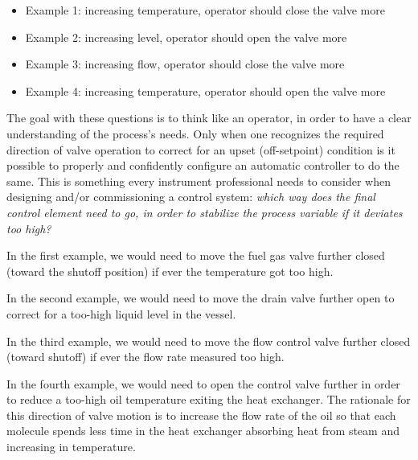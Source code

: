 





\begin{itemize}
\item{} Example 1: increasing temperature, operator should close the valve more
\item{} Example 2: increasing level, operator should open the valve more
\item{} Example 3: increasing flow, operator should close the valve more
\item{} Example 4: increasing temperature, operator should open the valve more
\end{itemize}

The goal with these questions is to think like an operator, in order to have a clear understanding of the process's needs.  Only when one recognizes the required direction of valve operation to correct for an upset (off-setpoint) condition is it possible to properly and confidently configure an automatic controller to do the same.  This is something every instrument professional needs to consider when designing and/or commissioning a control system: {\it which way does the final control element need to go, in order to stabilize the process variable if it deviates too high?}

\vskip 10pt

In the first example, we would need to move the fuel gas valve further closed (toward the shutoff position) if ever the temperature got too high.

\vskip 10pt

In the second example, we would need to move the drain valve further open to correct for a too-high liquid level in the vessel.

\vskip 10pt

In the third example, we would need to move the flow control valve further closed (toward shutoff) if ever the flow rate measured too high.

\vskip 10pt

In the fourth example, we would need to open the control valve further in order to reduce a too-high oil temperature exiting the heat exchanger.  The rationale for this direction of valve motion is to increase the flow rate of the oil so that each molecule spends less time in the heat exchanger absorbing heat from steam and increasing in temperature.











